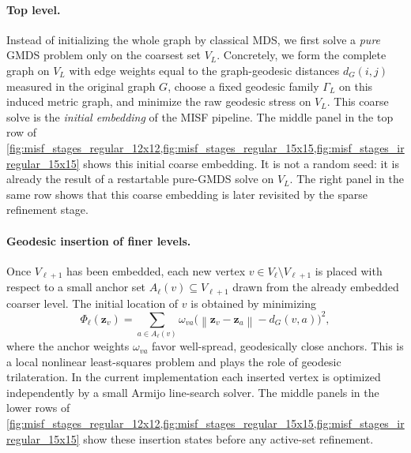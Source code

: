\documentclass[twoside,11pt]{article}
\newcommand{\bz}{\mathbf{z}}
\newcommand{\norm}[1]{\left\|#1\right\|}
\begin{document}
\paragraph{Top level.}
Instead of initializing the whole graph by classical MDS, we first solve a
\emph{pure} GMDS problem only on the coarsest set $V_L$.  Concretely, we form
the complete graph on $V_L$ with edge weights equal to the graph-geodesic
distances $d_G(i,j)$ measured in the original graph $G$, choose a fixed
geodesic family $\Gamma_L$ on this induced metric graph, and minimize the raw
geodesic stress on $V_L$.  This coarse solve is the \emph{initial embedding} of
the MISF pipeline.  The middle panel in the top row of
\cref{fig:misf_stages_regular_12x12,fig:misf_stages_regular_15x15,fig:misf_stages_irregular_15x15}
shows this initial coarse embedding.  It is not a random seed: it is already
the result of a restartable pure-GMDS solve on $V_L$.  The right panel in the
same row shows that this coarse embedding is later revisited by the sparse
refinement stage.

\paragraph{Geodesic insertion of finer levels.}
Once $V_{\ell+1}$ has been embedded, each new vertex $v \in V_\ell \setminus
V_{\ell+1}$ is placed with respect to a small anchor set
$A_\ell(v) \subseteq V_{\ell+1}$ drawn from the already embedded coarser level.
The initial location of $v$ is obtained by minimizing
\[
  \Phi_\ell(\bz_v)
  =
  \sum_{a \in A_\ell(v)}
  \omega_{va}
  \bigl( \norm{\bz_v - \bz_a} - d_G(v,a) \bigr)^2,
\]
where the anchor weights $\omega_{va}$ favor well-spread, geodesically close
anchors.  This is a local nonlinear least-squares problem and plays the role of
geodesic trilateration.  In the current implementation each inserted vertex is
optimized independently by a small Armijo line-search solver.  The middle
panels in the lower rows of
\cref{fig:misf_stages_regular_12x12,fig:misf_stages_regular_15x15,fig:misf_stages_irregular_15x15}
show these insertion states before any active-set refinement.
\end{document}
